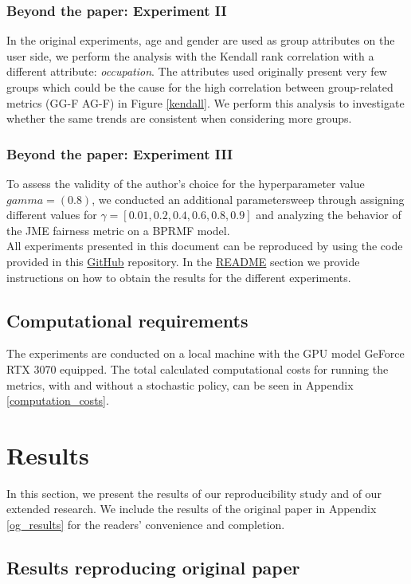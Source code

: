 \subsubsection{Beyond the paper: Experiment II} 
In the original experiments, age and gender are used as group attributes on the user side, we perform the analysis with the Kendall rank correlation with a different attribute: \textit{occupation}. The attributes used originally present very few groups which could be the cause for the high correlation between group-related metrics (GG-F AG-F) in Figure \ref{kendall}. We perform this analysis to investigate whether the same trends are consistent when considering more groups. 

\subsubsection{Beyond the paper: Experiment III}
To assess the validity of the author's choice for the hyperparameter value $gamma=(0.8)$, we conducted an additional parametersweep through assigning different values for $\gamma = [0.01, 0.2, 0.4, 0.6, 0.8, 0.9]$ and analyzing the behavior of the JME fairness metric on a BPRMF model.
\\
All experiments presented in this document can be reproduced by using the code provided in this \href{https://github.com/OlineRanum/FACT.git}{GitHub} repository. In the \href{https://github.com/OlineRanum/FACT#readme}{README} section we provide instructions on how to obtain the results for the different experiments. 

\subsection{Computational requirements}
The experiments are conducted on a local machine with the GPU model GeForce RTX 3070 equipped. The total calculated computational costs for running the metrics, with and without a stochastic policy, can be seen in Appendix \ref{computation_costs}.

\section{Results}
\label{sec:results}
In this section, we present the results of our reproducibility study and of our extended research.
We include the results of the original paper in Appendix \ref{og_results} for the readers' convenience and completion.

\subsection{Results reproducing original paper}
